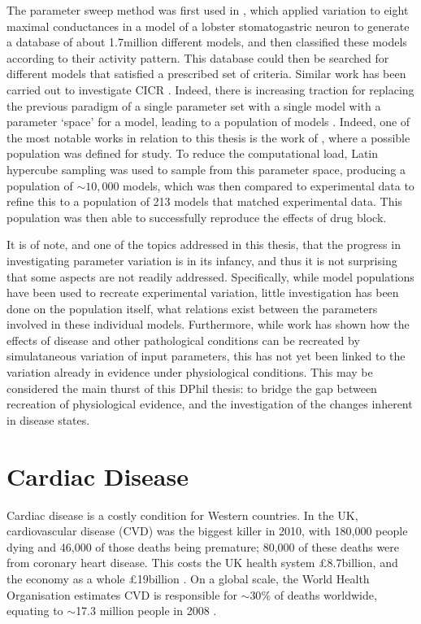 \documentclass[../thesis-main.tex]{subfiles}
\begin{document}
The parameter sweep method was first used in \citet{Prinz2003}, which applied variation to eight maximal conductances in a model of a lobster stomatogastric neuron to generate a database of about 1.7million different models, and then classified these models according to their activity pattern. This database could then be searched for different models that satisfied a prescribed set of criteria. Similar work has been carried out to investigate CICR \citep{Sobie2009a}. Indeed, there is increasing traction for replacing the previous paradigm of a single parameter set with a single model with a parameter `space' for a model, leading to a population of models \citep{Davies2012, Taylor2009, Prinz2003, Marder2011}. Indeed, one of the most notable works in relation to this thesis is the work of \citep{Britton2013}, where a possible population was defined for study. To reduce the computational load, Latin hypercube sampling was used to sample from this parameter space, producing a population of $\sim10,000$ models, which was then compared to experimental data to refine this to a population of 213 models that matched experimental data. This population was then able to successfully reproduce the effects of \ikr{} drug block.

It is of note, and one of the topics addressed in this thesis, that the progress in investigating parameter variation is in its infancy, and thus it is not surprising that some aspects are not readily addressed. Specifically, while model populations have been used to recreate experimental variation, little investigation has been done on the population itself, \idest{} what relations exist between the parameters involved in these individual models. Furthermore, while work has shown how the effects of disease and other pathological conditions can be recreated by simulataneous variation of input parameters, this has not yet been linked to the variation already in evidence under physiological conditions. This may be considered the main thurst of this DPhil thesis: to bridge the gap between recreation of physiological evidence, and the investigation of the changes inherent in disease states.

\section{Cardiac Disease}
\label{sec:disease}
Cardiac disease is a costly condition for Western countries. In the UK, cardiovascular disease (CVD) was the biggest killer in 2010, with 180,000 people dying and 46,000 of those deaths being premature; 80,000 of these deaths were from coronary heart disease. This costs the UK health system \pounds8.7billion, and the economy as a whole \pounds19billion \citep{Townsend2012}. On a global scale, the World Health Organisation estimates CVD is responsible for $\sim$30$\%$ of deaths worldwide, equating to $\sim$17.3 million people in 2008 \citep{WHO2010}.
\end{document}
